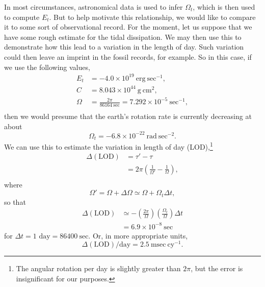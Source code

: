 \documentclass[11pt]{article}
\begin{document}
In most circumstances, astronomical data is used to infer $\Omega_t$, which is then used to compute $E_t$. But to help motivate this relationship, we would like to compare it to some sort of observational record. For the moment, let us suppose that we have some rough estimate for the tidal dissipation. We may then use this to demonstrate how this lead to a variation in the length of day. Such variation could then leave an imprint in the fossil records, for example. So in this case, if we use the following values,\cite{Lambeck}
\begin{align*}
E_t &= -4.0 \times 10^{19} \ \textrm{erg} \ \textrm{sec}^{-1}, \\
C &= 8.043 \times 10^{44} \ \textrm{g} \ \textrm{cm}^2, \\
\Omega &= \frac{2 \pi}{86164 \ \textrm{sec}} = 7.292 \times 10^{-5} \ \textrm{sec}^{-1}, \\
\end{align*}
then we would presume that the earth's rotation rate is currently decreasing at about
\begin{equation*}
\Omega_t = - 6.8 \times 10^{-22} \ \textrm{rad} \ \textrm{sec}^{-2}.
\end{equation*}
We can use this to estimate the variation in length of day (LOD),\footnote{The angular rotation per day is slightly greater than $2\pi$, but the error is insignificant for our purposes.}
\begin{equation*}
\begin{split}
\Delta(\textrm{LOD}) &= \tau' - \tau \\
&= 2 \pi \left(\frac{1}{\Omega'} - \frac{1}{\Omega} \right), \\
\end{split}
\end{equation*}
where
\begin{equation*}
\Omega' = \Omega + \Delta\Omega \simeq \Omega + \Omega_t \Delta t,
\end{equation*}
so that
\begin{equation}
\begin{split}
\Delta(\textrm{LOD}) &\simeq -\left(\frac{2 \pi}{\Omega}\right) \left(\frac{\Omega_t}{\Omega}\right) \Delta t  \\
 &= 6.9 \times 10^{-8} \ \textrm{sec}
\end{split}
\end{equation}
for $\Delta t = \textrm{1 day} = 86400 \ \textrm{sec}$. Or, in more appropriate units,
\begin{equation*}
\Delta(\textrm{LOD}) / \textrm{day} = 2.5 \ \textrm{msec} \ \textrm{cy}^{-1}.
\end{equation*}
\end{document}
